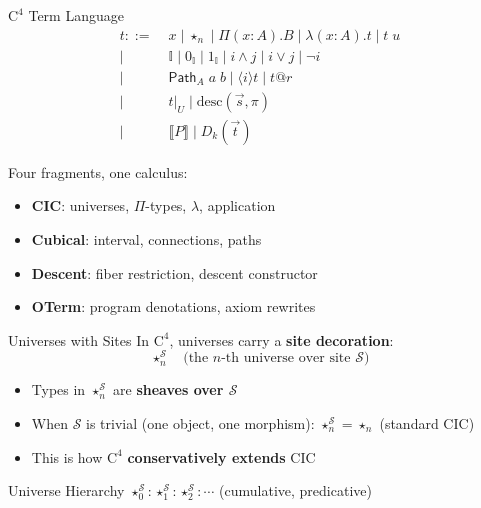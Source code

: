 \documentclass[aspectratio=169,11pt]{beamer}
\newcommand{\Cfour}{\mathrm{C}^4}
\newcommand{\Path}{\mathsf{Path}}
\newcommand{\interval}{\mathbb{I}}
\newcommand{\site}{\mathcal{S}}
\newcommand{\den}[1]{\llbracket #1 \rrbracket}
\begin{document}
\begin{frame}{$\Cfour$ Term Language}
\small
\begin{align*}
t ::=&\; x \mid \star_n \mid \Pi(x:A).B \mid \lambda(x:A).t \mid t\;u \tag{CIC core} \\
\mid&\; \interval \mid 0_\interval \mid 1_\interval \mid i \land j \mid i \lor j \mid \lnot i \tag{Cubical} \\
\mid&\; \Path_A\;a\;b \mid \langle i \rangle t \mid t @ r \tag{Paths} \\
\mid&\; t|_U \mid \mathrm{desc}(\vec{s}, \pi) \tag{Descent} \\
\mid&\; \den{P} \mid D_k(\vec{t}) \tag{OTerm}
\end{align*}

\vspace{0.3em}
Four fragments, one calculus:
\begin{itemize}
\item \textbf{CIC}: universes, $\Pi$-types, $\lambda$, application
\item \textbf{Cubical}: interval, connections, paths
\item \textbf{Descent}: fiber restriction, descent constructor
\item \textbf{OTerm}: program denotations, axiom rewrites
\end{itemize}
\end{frame}

\begin{frame}{Universes with Sites}
In $\Cfour$, universes carry a \textbf{site decoration}:
\[
\star_n^{\site} \quad \text{(the $n$-th universe over site $\site$)}
\]

\vspace{0.5em}
\begin{itemize}
\item Types in $\star_n^{\site}$ are \textbf{sheaves over $\site$}
\item When $\site$ is trivial (one object, one morphism): $\star_n^{\site} = \star_n$ (standard CIC)
\item This is how $\Cfour$ \textbf{conservatively extends} CIC
\end{itemize}

\vspace{0.5em}
\begin{block}{Universe Hierarchy}
$\star_0^{\site} : \star_1^{\site} : \star_2^{\site} : \cdots$ \quad (cumulative, predicative)
\end{block}
\end{frame}
\end{document}
